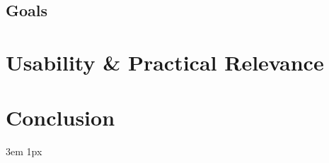 \documentclass{Academic}
\begin{document}
\subsection{Goals}

\section{Usability \& Practical Relevance}

\section{Conclusion}

\singlespacing
\emergencystretch 3em
\hfuzz 1px
\printbibliography[heading=bibnumbered]




\end{document}
